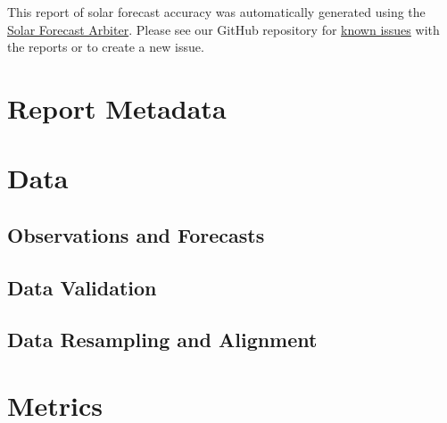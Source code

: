 \documentclass[12pt,letterpaper]{article}
\begin{document}
\title{}
\maketitle
This report of solar forecast accuracy was automatically generated using the
\href{https://solarforecastarbiter.org}{Solar Forecast Arbiter}. Please see
our GitHub repository for
\href{https://github.com/solararbiter/solarforecastarbiter-core/issues?q=is%3Aissue+is%3Aopen+label%3Areports}{known issues}
with the reports or to create a new issue.

\tableofcontents
\cleardoublepage
\listoffigures
\cleardoublepage
\listoftables
\cleardoublepage

\section{Report Metadata}

\section{Data}

\subsection{Observations and Forecasts}

\subsection{Data Validation}

\subsection{Data Resampling and Alignment}

\section{Metrics}
\FloatBarrier

\begin{table}[h]
  \centering
  \caption{Table of  metrics.}
\end{table}
\end{document}
